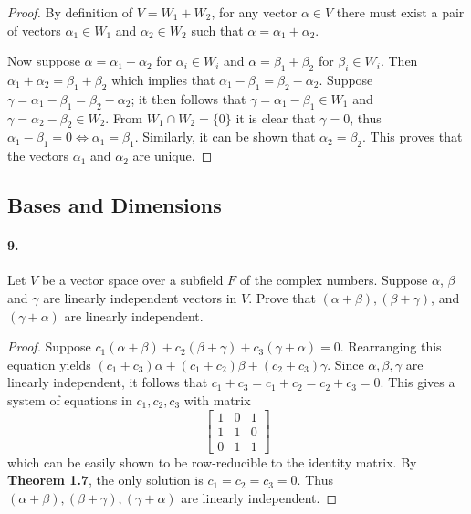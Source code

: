 \documentclass{article}
\begin{document}
\begin{proof}
  By definition of $V = W_1 + W_2$, for any vector $\alpha \in V$ there must
  exist a pair of vectors $\alpha_1 \in W_1$ and $\alpha_2 \in W_2$ such that
  $\alpha = \alpha_1 + \alpha_2$.

  Now suppose $\alpha = \alpha_1 + \alpha_2$ for $\alpha_i \in W_i$ and $\alpha
  = \beta_1 + \beta_2$ for $\beta_i \in W_i$. Then $\alpha_1 + \alpha_2 =
  \beta_1 + \beta_2$ which implies that $\alpha_1 - \beta_1 = \beta_2 -
  \alpha_2$. Suppose $\gamma = \alpha_1 - \beta_1 = \beta_2 - \alpha_2$; it then
  follows that $\gamma = \alpha_1 - \beta_1 \in W_1$ and $\gamma = \alpha_2 -
  \beta_2 \in W_2$. From $W_1 \cap W_2 = \{0\}$ it is clear that $\gamma = 0$,
  thus $\alpha_1 - \beta_1 = 0 \iff \alpha_1 = \beta_1$. Similarly, it can be
  shown that $\alpha_2 = \beta_2$. This proves that the vectors $\alpha_1$ and
  $\alpha_2$ are unique.
\end{proof}

\subsection{Bases and Dimensions}

\paragraph{9.} Let $V$ be a vector space over a subfield $F$ of the complex
numbers. Suppose $\alpha$, $\beta$ and $\gamma$ are linearly independent vectors
in $V$. Prove that $(\alpha + \beta), (\beta + \gamma)$, and $(\gamma + \alpha)$
are linearly independent.

\begin{proof}
  Suppose $c_1(\alpha + \beta) + c_2(\beta + \gamma) + c_3(\gamma + \alpha) =
  0$. Rearranging this equation yields $(c_1 + c_3)\alpha + (c_1 + c_2) \beta +
  (c_2 + c_3)\gamma$. Since $\alpha, \beta, \gamma$ are linearly independent, it
  follows that $c_1 + c_3 = c_1 + c_2 = c_2 + c_3 = 0$. This gives a system of
  equations in $c_1, c_2, c_3$ with matrix \[
    \begin{bmatrix}
      1 & 0 & 1 \\
      1 & 1 & 0 \\
      0 & 1 & 1
    \end{bmatrix}
  \] which can be easily shown to be row-reducible to the identity matrix. By
  \textbf{Theorem 1.7}, the only solution is $c_1 = c_2 = c_3 = 0$. Thus
  $(\alpha + \beta), (\beta + \gamma), (\gamma + \alpha)$ are linearly
  independent.
\end{proof}
\end{document}
